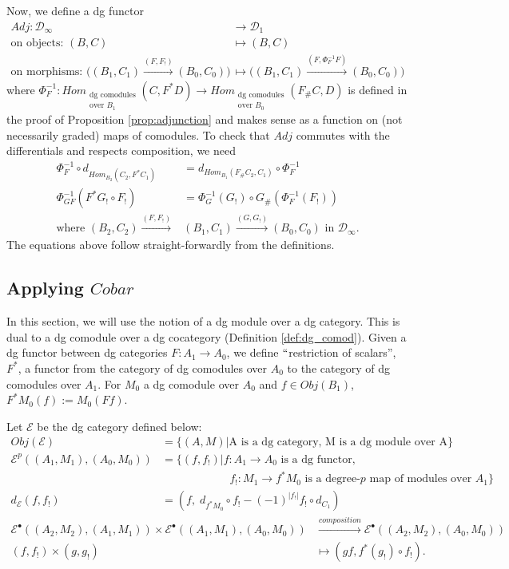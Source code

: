 Now, we define a dg functor 
\begin{align*}
Adj: \mathcal{D}_\infty 
&\to 
\mathcal{D}_1\\
\textrm{on objects: }(B,C)
& \mapsto
(B,C)\\
\textrm{on morphisms: }\bigg((B_1, C_1) 
  \xrightarrow{(F, F_!)} (B_0,C_0)\bigg)
& \mapsto
\bigg((B_1, C_1) 
  \xrightarrow{(F, \Phi^{-1}_FF)} 
  (B_0,C_0)\bigg)
\end{align*}
where 
$\Phi^{-1}_F:Hom_{\substack{
  \textrm{dg comodules}\\\textrm{over $B_1$}}}
  (C,F^*D) 
\to 
Hom_{\substack{
  \textrm{dg comodules}\\\textrm{over $B_0$}}}
  (F_\#C,D)$
is defined in the proof of Proposition 
\ref{prop:adjunction} and makes sense as 
a function on (not necessarily graded) 
maps of comodules. To check that $Adj$ 
commutes with the differentials and 
respects composition, we need
\begin{align*}
\Phi^{-1}_F \circ d_{Hom_{B_2}(C_2, F^*C_1)}
&= 
d_{Hom_{B_1}(F_\#C_2, C_1)} \circ \Phi^{-1}_F\\
\Phi^{-1}_{GF}(F^*G_! \circ F_!)
&=
\Phi^{-1}_G(G_!) \circ G_\#(\Phi^{-1}_F(F_!))\\
\textrm{where }
(B_2, C_2) 
  \xrightarrow{(F, F_!)} &(B_1,C_1)
  \xrightarrow{(G, G_!)} (B_0,C_0)
  \textrm{ in }\mathcal{D}_\infty.
\end{align*}
The equations above follow straight-forwardly 
from the definitions.
%
%
\subsection{Applying $Cobar$}
In this section, we will use the notion of 
a dg module over a dg category. This is 
dual to a dg comodule over 
a dg cocategory (Definition \ref{def:dg_comod}). 
Given a dg functor between dg categories 
$F:A_1 \to A_0$, we define $``$restriction 
of scalars'', $F^*$, a functor from 
the category of dg comodules over $A_0$ 
to the category of dg comodules over $A_1$. 
For $M_0$ a dg comodule over $A_0$ and $f \in 
Obj(B_1)$, $F^*M_0(f):=M_0(Ff)$.

Let $\mathcal{E}$ be the dg category defined 
below:
\begin{align*}
Obj(\mathcal{E}) 
&= 
\{(A,M) |
  \textrm{A is a dg category, 
  M is a dg module over A}\} \\
\mathcal{E}^p((A_1, M_1), (A_0, M_0))  
&= 
\{(f, f_!) | f:A_1 \to A_0 
  \textrm{ is a dg functor,}\\
& \phantom{{}=[(f, f_!)]{}}  
  f_!:M_1 \to f^*M_0 
  \textrm{ is a degree-$p$ map of modules over }
  A_1\}\\
d_{\mathcal{E}}(f,f_!)
&=
(f,\; d_{f^*M_0} \circ f_! - (-1)^{|f_!|} 
f_! \circ d_{C_1})  
\end{align*}
\begin{align*}  
\mathcal{E}^\bullet((A_2, M_2), (A_1, M_1)) \times  
\mathcal{E}^\bullet((A_1, M_1), (A_0, M_0))
&\xrightarrow{composition}
\mathcal{E}^\bullet((A_2, M_2), (A_0, M_0))\\
(f,f_!) \times (g, g_!)
&\mapsto
(gf, f^*(g_!)\circ f_!).
\end{align*}

